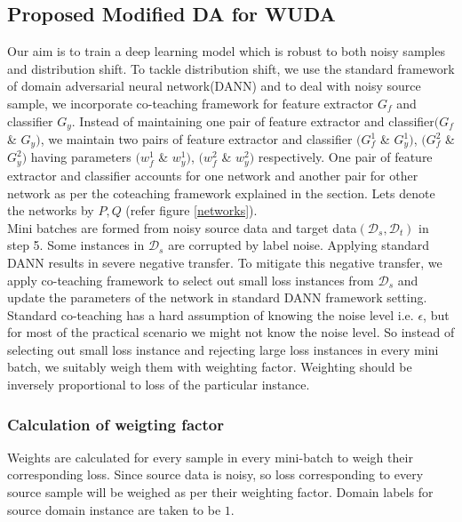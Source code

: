 


\subsection{Proposed Modified DA for WUDA}
Our aim is to train a deep learning model which is robust to both noisy samples and distribution shift. To tackle distribution shift, we use the standard framework of domain adversarial neural network(DANN) and to deal with noisy source sample, we incorporate co-teaching framework for feature extractor $G_f$ and classifier $G_y$. 
Instead of maintaining one pair of feature extractor and classifier$(G_f$ \& $G_y)$, we maintain two pairs of feature extractor and classifier $(G_{f}^1$ \& $G_{y}^1)$, $(G_{f}^2$ \& $G_{y}^2)$ having parameters $(w_{f}^1$ \& $w_{y}^1)$, $(w_{f}^2$ \& $w_{y}^2)$ respectively. One pair of feature extractor and classifier accounts for one network and another pair for other network as per the coteaching framework explained in the section. Lets denote the networks by $P, Q$ (refer figure \ref{networks}). \\
Mini batches are formed from noisy source data and target data$(\mathcal{D}_s, \mathcal{D}_t)$ in step 5. Some instances in $\mathcal{D}_s$ are corrupted by label noise. Applying standard DANN results in severe negative transfer. To mitigate this negative transfer, we apply co-teaching framework to select out small loss instances from $\mathcal{D}_s$ and update the parameters of the network in standard DANN framework setting.\\
Standard co-teaching has a hard assumption of knowing the noise level i.e. $\epsilon$, but for most of the practical scenario we might not know the noise level. So instead of selecting out small loss instance and rejecting large loss instances in every mini batch, we suitably weigh them with weighting factor. Weighting should be inversely proportional to loss of the particular instance.

\subsubsection{Calculation of weigting factor}
Weights are calculated for every sample in every mini-batch to weigh their corresponding loss. Since source data is noisy, so loss corresponding to every source sample will be weighed as per their weighting factor. Domain labels for source domain instance are taken to be $1$.

